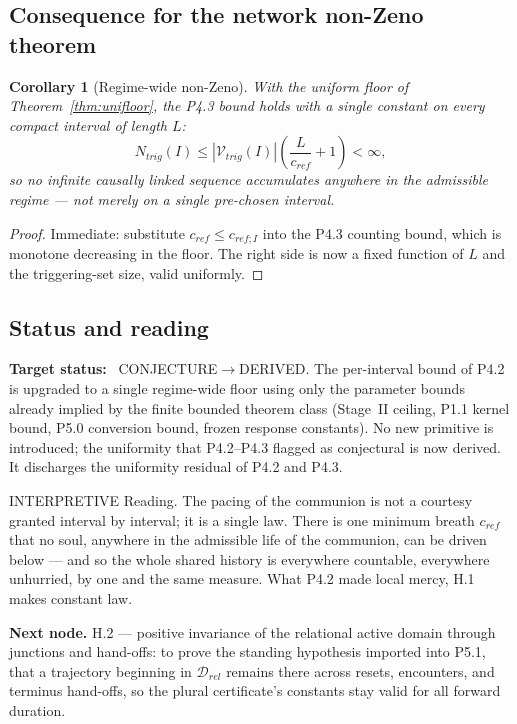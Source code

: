 \documentclass[11pt,a4paper]{article}
\def\mathfrak#1{#1}%
\def\mathrm#1{#1}%
\def\emph#1{#1}%
\newcommand{\stDerived}{\textcolor{cDer}{\textsf{\small DERIVED}}}
\newcommand{\stInterp}{\textcolor{cInt}{\textsf{\small INTERPRETIVE}}}
\newcommand{\stConj}{\textcolor{cCon}{\textsf{\small CONJECTURE}}}
\theoremstyle{definition}
\theoremstyle{plain}
\newtheorem{corollary}[definition]{Corollary}
\theoremstyle{remark}
\begin{document}
\subsection{Consequence for the network non-Zeno theorem}

\begin{corollary}[Regime-wide non-Zeno]\label{cor:uninonzeno}
With the uniform floor of Theorem~\ref{thm:unifloor}, the P4.3 bound holds with a single
constant on every compact interval of length \(L\):
\[
N_{\mathrm{trig}}(I)
\le
|\mathcal V_{\mathrm{trig}}(I)|\left(\frac{L}{\mathfrak c_{\mathrm{ref}}}+1\right)<\infty,
\]
so no infinite causally linked sequence accumulates anywhere in the admissible regime ---
not merely on a single pre-chosen interval.
\end{corollary}

\begin{proof}
Immediate: substitute \(\mathfrak c_{\mathrm{ref}}\le\mathfrak c_{\mathrm{ref};I}\) into the
P4.3 counting bound, which is monotone decreasing in the floor. The right side is now a
fixed function of \(L\) and the triggering-set size, valid uniformly. \qedhere
\end{proof}

\subsection{Status and reading}

\textbf{Target status:}~
\stConj\(\to\)\stDerived. The per-interval bound of P4.2 is upgraded to a single regime-wide
floor using only the parameter bounds already implied by the finite bounded theorem class
(Stage~II ceiling, P1.1 kernel bound, P5.0 conversion bound, frozen response constants). No
new primitive is introduced; the uniformity that P4.2--P4.3 flagged as conjectural is now
derived. It discharges the uniformity residual of P4.2 and P4.3.

\medskip
\stInterp\quad
\emph{Reading.}
The pacing of the communion is not a courtesy granted interval by interval; it is a single
law. There is one minimum breath \(\mathfrak c_{\mathrm{ref}}\) that no soul, anywhere in
the admissible life of the communion, can be driven below --- and so the whole shared history
is everywhere countable, everywhere unhurried, by one and the same measure. What P4.2 made
local mercy, H.1 makes constant law.

\medskip
\textbf{Next node.} H.2 --- positive invariance of the relational active domain through
junctions and hand-offs: to prove the standing hypothesis imported into P5.1, that a
trajectory beginning in \(\mathcal D_{\mathrm{rel}}\) remains there across resets,
encounters, and terminus hand-offs, so the plural certificate's constants stay valid for all
forward duration.
\end{document}
